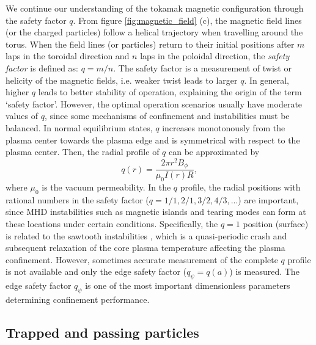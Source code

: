 We continue our understanding of the tokamak magnetic configuration through the safety factor $q$. From figure \ref{fig:magnetic_field} (c), the magnetic field lines (or the charged particles) follow a helical trajectory when travelling around the torus. When the field lines (or particles) return to their initial positions after $m$ laps in the toroidal direction and $n$ laps in the poloidal direction, the \emph{safety factor} is defined as: $q = m/n$. The safety factor is a measurement of twist or helicity of the magnetic fields, i.e. weaker twist leads to larger $q$. In general, higher $q$ leads to better stability of operation, explaining the origin of the term `safety factor'. However, the optimal operation scenarios usually have moderate values of $q$, since some mechanisms of confinement and instabilities must be balanced. In normal equilibrium states, $q$ increases monotonously from the plasma center towards the plasma edge and is symmetrical with respect to the plasma center. Then, the radial profile of $q$ can be approximated by%
\begin{equation}
q(r) = \frac{2{\pi}r^2B_{\phi}}{\mu_0I(r)R},
\end{equation}
\noindent where $\mu_0$ is the vacuum permeability. In the $q$ profile, the radial positions with rational numbers in the safety factor ($q = 1/1,2/1,3/2,4/3,...$) are important, since MHD instabilities such as magnetic islands and tearing modes can form at these locations under certain conditions. Specifically, the $q = 1$ position (surface) is related to the sawtooth instabilities \cite{Chapman_2011_PPCF_ST_review}, which is a quasi-periodic crash and subsequent relaxation of the core plasma temperature affecting the plasma confinement. However, sometimes accurate measurement of the complete $q$ profile is not available and only the edge safety factor ($q_{\psi} = q(a)$) is measured. The edge safety factor $q_{\psi}$ is one of the most important dimensionless parameters determining confinement performance.


\subsection{Trapped and passing particles}

